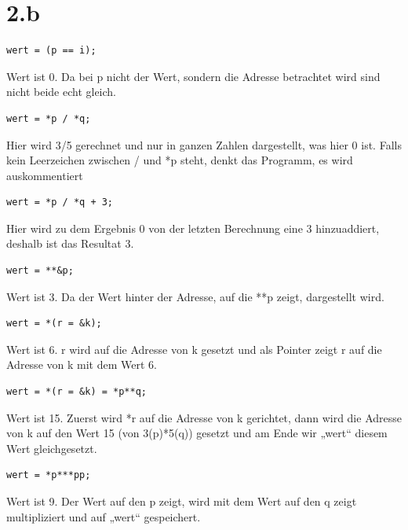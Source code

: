 \section*{2.b}
\begin{lstlisting}
wert = (p == i);
\end{lstlisting}
Wert ist 0. Da bei p nicht der Wert, sondern die Adresse betrachtet wird sind nicht beide echt gleich.
\begin{lstlisting}
wert = *p / *q;
\end{lstlisting}
Hier wird 3/5 gerechnet und nur in ganzen Zahlen dargestellt, was hier 0 ist. Falls kein Leerzeichen zwischen / und *p steht, denkt das Programm, es wird auskommentiert
\begin{lstlisting}
wert = *p / *q + 3;
\end{lstlisting}
Hier wird zu dem Ergebnis 0 von der letzten Berechnung eine 3 hinzuaddiert, deshalb ist das Resultat 3.
\begin{lstlisting}
wert = **&p;
\end{lstlisting}
Wert ist 3. Da der Wert hinter der Adresse, auf die **p zeigt, dargestellt wird.
\begin{lstlisting}
wert = *(r = &k);
\end{lstlisting}
Wert ist 6. r wird auf die Adresse von k gesetzt und als Pointer zeigt r auf die Adresse von k mit dem Wert 6.
\begin{lstlisting}
wert = *(r = &k) = *p**q;
\end{lstlisting}
Wert ist 15. Zuerst wird *r auf die Adresse von k gerichtet, dann wird die Adresse von k auf den Wert 15 (von 3(p)*5(q)) gesetzt und am Ende wir „wert“ diesem Wert gleichgesetzt.
\begin{lstlisting}
wert = *p***pp;
\end{lstlisting}
Wert ist 9. Der Wert auf den p zeigt, wird mit dem Wert auf den q zeigt multipliziert und auf „wert“ gespeichert.



